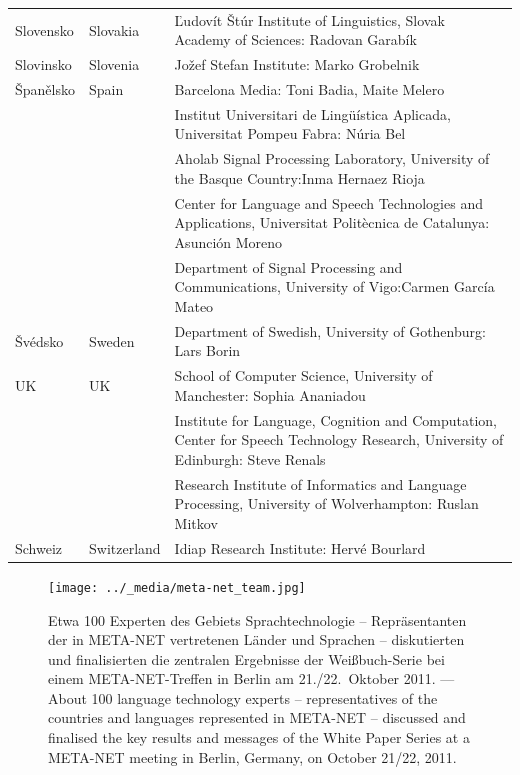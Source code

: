 \documentclass[]{../../metanetpaper}
\begin{document}
\begin{longtable}{@{}llp{113mm}@{}}
  Slovensko & \textcolor{grey1}{Slovakia} & Ľudovít Štúr Institute of Linguistics, Slovak Academy of Sciences: Radovan Garabík \\ \addlinespace 
  Slovinsko & \textcolor{grey1}{Slovenia} & Jožef Stefan Institute: Marko Grobelnik \\ \addlinespace 
  Španělsko & \textcolor{grey1}{Spain} & Barcelona Media: Toni Badia, Maite Melero \\ \addlinespace 
  & & Institut Universitari de Lingüística Aplicada, Universitat Pompeu Fabra: Núria Bel \\ \addlinespace 
  & & Aholab Signal Processing Laboratory, University of the Basque Country:\newline Inma Hernaez Rioja \\ \addlinespace 
  & & Center for Language and Speech Technologies and Applications, Universitat Politècnica de Catalunya:  Asunción Moreno \\ \addlinespace 
  & & Department of Signal Processing and Communications, University of Vigo:\newline Carmen García Mateo \\ \addlinespace
  Švédsko & \textcolor{grey1}{Sweden} & Department of Swedish, University of Gothenburg: Lars Borin \\ \addlinespace 
  UK & \textcolor{grey1}{UK} & 
  School of Computer Science, University of Manchester: Sophia Ananiadou \\ \addlinespace 
  & & Institute for Language, Cognition and Computation, Center for Speech Technology Research, University of Edinburgh: Steve Renals \\ \addlinespace 
  & & Research Institute of Informatics and Language Processing, University of Wolverhampton: Ruslan Mitkov \\ \addlinespace  
  Schweiz & \textcolor{grey1}{Switzerland} & Idiap Research Institute: Hervé Bourlard  %
    
\end{longtable}
\normalsize
 
\renewcommand*{\figureformat}{}
\renewcommand*{\captionformat}{}

\begin{figure}[htbp]
  \center
  \texttt{[image: ../\_media/meta-net\_team.jpg]}
  \caption{Etwa 100 Experten des Gebiets Sprachtechnologie -- Repräsentanten der in META-NET vertretenen Länder und Sprachen -- diskutierten und finalisierten die zentralen Ergebnisse der Weißbuch-Serie bei einem META-NET-Treffen in Berlin am 21./22.~Oktober 2011. --- \textcolor{grey1}{About 100 language technology experts -- representatives of the countries and languages represented in META-NET -- discussed and finalised the key results and messages of the White Paper Series at a META-NET meeting in Berlin, Germany, on October 21/22, 2011.}}
  \medskip
\end{figure}
\end{document}
